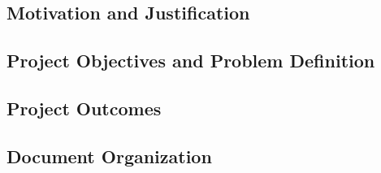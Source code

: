\subsection{Motivation and Justification}

\subsection{Project Objectives and Problem Definition}

\subsection{Project Outcomes}

\subsection{Document Organization}

